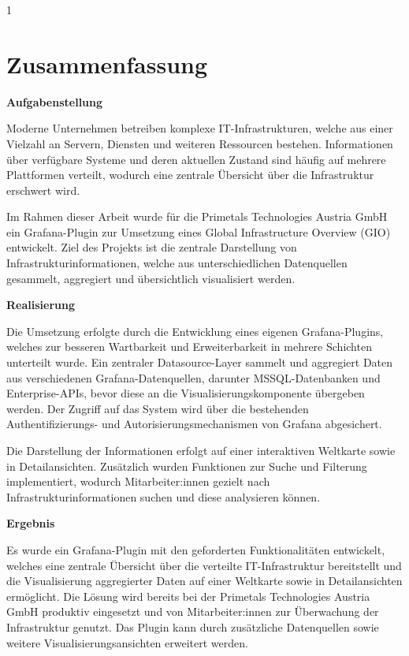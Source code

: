 \newpage

\begin{spacing}{1}
    \chapter*{Zusammenfassung}
\end{spacing}

\textbf{Aufgabenstellung}

Moderne Unternehmen betreiben komplexe IT-Infrastrukturen, welche aus einer
Vielzahl an Servern, Diensten und weiteren Ressourcen bestehen. Informationen
über verfügbare Systeme und deren aktuellen Zustand sind häufig auf mehrere
Plattformen verteilt, wodurch eine zentrale Übersicht über die Infrastruktur
erschwert wird.

Im Rahmen dieser Arbeit wurde für die Primetals Technologies Austria GmbH ein
Grafana-Plugin zur Umsetzung eines Global Infrastructure Overview (GIO)
entwickelt. Ziel des Projekts ist die zentrale Darstellung von
Infrastrukturinformationen, welche aus unterschiedlichen Datenquellen gesammelt,
aggregiert und übersichtlich visualisiert werden.

\textbf{Realisierung}

Die Umsetzung erfolgte durch die Entwicklung eines eigenen Grafana-Plugins,
welches zur besseren Wartbarkeit und Erweiterbarkeit in mehrere Schichten
unterteilt wurde. Ein zentraler Datasource-Layer sammelt und aggregiert Daten
aus verschiedenen Grafana-Datenquellen, darunter MSSQL-Datenbanken und Enterprise-APIs,
bevor diese an die Visualisierungskomponente übergeben werden. Der Zugriff
auf das System wird über die bestehenden Authentifizierungs- und
Autorisierungsmechanismen von Grafana abgesichert.

Die Darstellung der Informationen erfolgt auf einer interaktiven Weltkarte sowie
in Detailansichten. Zusätzlich wurden Funktionen zur Suche und Filterung
implementiert, wodurch Mitarbeiter:innen gezielt nach Infrastrukturinformationen
suchen und diese analysieren können.

\textbf{Ergebnis}

Es wurde ein Grafana-Plugin mit den geforderten Funktionalitäten entwickelt,
welches eine zentrale Übersicht über die verteilte IT-Infrastruktur bereitstellt
und die Visualisierung aggregierter Daten auf einer Weltkarte sowie in
Detailansichten ermöglicht. Die Lösung wird bereits bei der Primetals
Technologies Austria GmbH produktiv eingesetzt und von Mitarbeiter:innen zur
Überwachung der Infrastruktur genutzt. Das Plugin kann durch zusätzliche
Datenquellen sowie weitere Visualisierungsansichten erweitert werden.